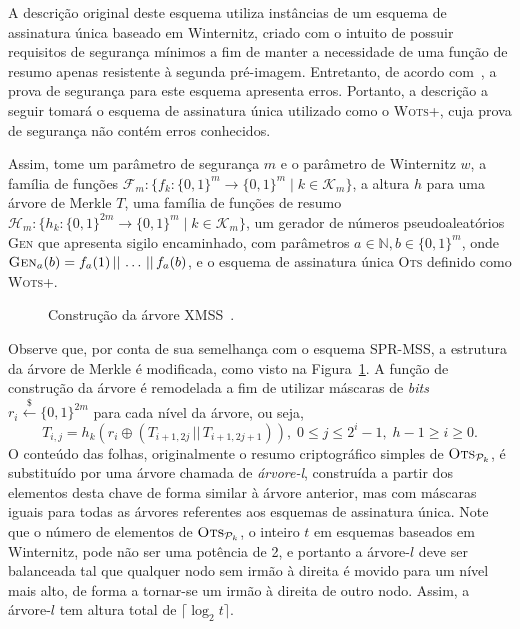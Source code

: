 \documentclass[12pt]{report}
\newcommand{\hh}{\mathcal{H}}
\newcommand{\pk}{\mathcal{P}_k}
\newcommand{\concat}{\, \vert \vert \,}
\newcommand{\binwds}[1]{\{0, 1\}^{#1}}
\begin{document}
A descrição original deste esquema utiliza instâncias de um esquema de assinatura única baseado em Winternitz, criado com o intuito de possuir requisitos de segurança mínimos a fim de manter a necessidade de uma função de resumo apenas resistente à segunda pré-imagem. Entretanto, de acordo com~\cite{LafrancePhilip2017}, a prova de segurança para este esquema apresenta erros. Portanto, a descrição a seguir tomará o esquema de assinatura única utilizado como o \textsc{Wots+}, cuja prova de segurança não contém erros conhecidos.

Assim, tome um parâmetro de segurança $m$ e o parâmetro de Winternitz $w$, a família de funções $\mathcal{F}_m : \{f_k : \binwds{m} \longrightarrow \binwds{m} \mid k \in
\mathcal{K}_m\}$, a altura $h$ para uma árvore de Merkle $T$, uma família de funções de resumo $\hh{}_m : \{h_k : \binwds{2m} \longrightarrow \binwds{m} \mid k \in
\mathcal{K}_m\}$, um gerador de números pseudoaleatórios \textsc{Gen} que apresenta sigilo encaminhado, com parâmetros $a \in \mathbb{N}, b \in \binwds{m}$, onde $\textsc{Gen}_{a}(b) = f_a(1) \concat \dots \concat f_a(b)$, e o esquema de assinatura única \textsc{Ots} definido como \textsc{Wots+}.

\begin{figure}
    \centering
    \caption{Construção da árvore XMSS~\cite{Buchmann:2011:XPF:2184003.2184011}.}
    \label{fig:8}
\end{figure}

Observe que, por conta de sua semelhança com o esquema SPR-MSS, a estrutura da árvore de Merkle é modificada, como visto na Figura~\ref{fig:8}. A função de construção da árvore é remodelada a fim de utilizar máscaras de \emph{bits} $r_i \stackrel{\$}{\longleftarrow} \binwds{2m}$ para cada nível da árvore, ou seja,
\begin{equation}
    T_{i, j} = h_k(r_i \oplus (T_{i + 1, 2j} \concat T_{i + 1, 2j + 1})),
      \; 0 \leq j \leq 2^{i} - 1, \; h - 1 \geq i \geq 0.
\end{equation}
O conteúdo das folhas, originalmente o resumo criptográfico simples de $\textsc{Ots}_{\pk{}}$, é substituído por uma árvore chamada de \emph{árvore-l}, construída a partir dos elementos desta chave de forma similar à árvore anterior, mas com máscaras iguais para todas as árvores referentes aos esquemas de assinatura única. Note que o número de elementos de $\textsc{Ots}_{\pk{}}$, o inteiro $t$ em esquemas baseados em Winternitz, pode não ser uma potência de 2, e portanto a árvore-$l$ deve ser balanceada tal que qualquer nodo sem irmão à direita é movido para um nível mais alto, de forma a tornar-se um irmão à direita de outro nodo. Assim, a árvore-$l$ tem altura total de $\lceil \log_{2} t \rceil$.
\end{document}
